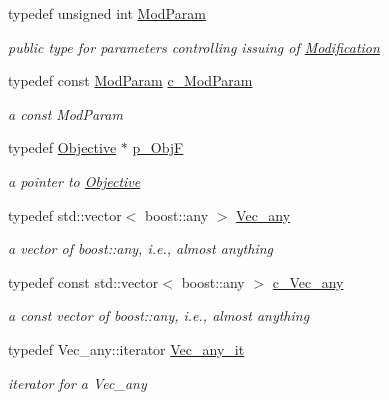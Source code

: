 \begin{DoxyCompactItemize}
typedef unsigned int \mbox{\hyperlink{group___modification___t_y_p_e_s_gac8fdf1a69f314970b9aaa9328e3f3907}{Mod\+Param}}
\begin{DoxyCompactList}\small\item\em public type for parameters controlling issuing of \mbox{\hyperlink{class_s_m_spp__di__unipi__it_1_1_modification}{Modification}} \end{DoxyCompactList}\item 
typedef const \mbox{\hyperlink{group___modification___t_y_p_e_s_gac8fdf1a69f314970b9aaa9328e3f3907}{Mod\+Param}} \mbox{\hyperlink{group___modification___t_y_p_e_s_ga544246d8c462e9a2d817c2c30797968f}{c\+\_\+\+Mod\+Param}}
\begin{DoxyCompactList}\small\item\em a const Mod\+Param \end{DoxyCompactList}\item 
typedef \mbox{\hyperlink{class_s_m_spp__di__unipi__it_1_1_objective}{Objective}} $\ast$ \mbox{\hyperlink{group___objective___t_y_p_e_s_ga24e6a764a1077f62c73a5733e6603755}{p\+\_\+\+ObjF}}
\begin{DoxyCompactList}\small\item\em a pointer to \mbox{\hyperlink{class_s_m_spp__di__unipi__it_1_1_objective}{Objective}} \end{DoxyCompactList}\item 
typedef std\+::vector$<$ boost\+::any $>$ \mbox{\hyperlink{group___s_m_s__types_ga58ded0963812566c064a5177b2f84c28}{Vec\+\_\+any}}
\begin{DoxyCompactList}\small\item\em a vector of boost\+::any, i.\+e., almost anything \end{DoxyCompactList}\item 
typedef const std\+::vector$<$ boost\+::any $>$ \mbox{\hyperlink{group___s_m_s__types_gaa16aeddc7a50d64299ee0f8d9ca5dc7d}{c\+\_\+\+Vec\+\_\+any}}
\begin{DoxyCompactList}\small\item\em a const vector of boost\+::any, i.\+e., almost anything \end{DoxyCompactList}\item 
typedef Vec\+\_\+any\+::iterator \mbox{\hyperlink{group___s_m_s__types_ga8dc169a813140dc233f5157dc574e753}{Vec\+\_\+any\+\_\+it}}
\begin{DoxyCompactList}\small\item\em iterator for a Vec\+\_\+any \end{DoxyCompactList}\item 

\end{DoxyCompactItemize}
